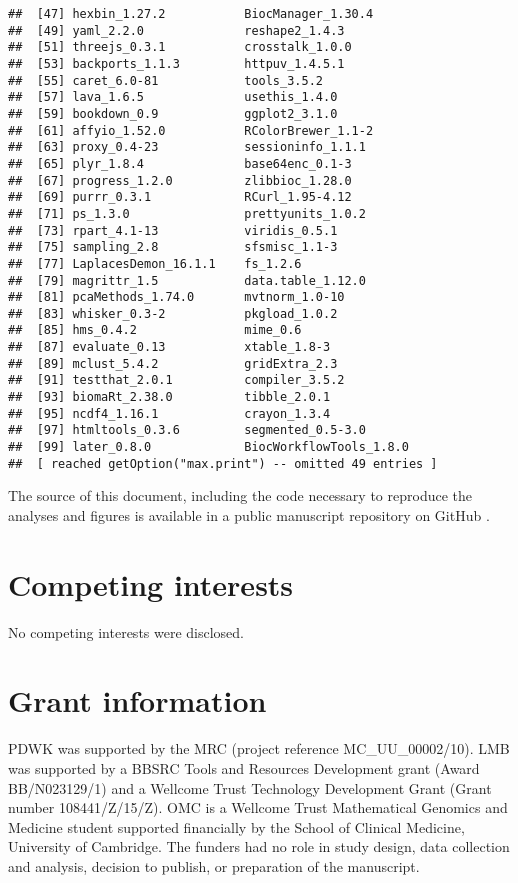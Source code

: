 \documentclass[9pt,a4paper,]{extarticle}
\begin{document}
\begin{verbatim}
##  [47] hexbin_1.27.2           BiocManager_1.30.4     
##  [49] yaml_2.2.0              reshape2_1.4.3         
##  [51] threejs_0.3.1           crosstalk_1.0.0        
##  [53] backports_1.1.3         httpuv_1.4.5.1         
##  [55] caret_6.0-81            tools_3.5.2            
##  [57] lava_1.6.5              usethis_1.4.0          
##  [59] bookdown_0.9            ggplot2_3.1.0          
##  [61] affyio_1.52.0           RColorBrewer_1.1-2     
##  [63] proxy_0.4-23            sessioninfo_1.1.1      
##  [65] plyr_1.8.4              base64enc_0.1-3        
##  [67] progress_1.2.0          zlibbioc_1.28.0        
##  [69] purrr_0.3.1             RCurl_1.95-4.12        
##  [71] ps_1.3.0                prettyunits_1.0.2      
##  [73] rpart_4.1-13            viridis_0.5.1          
##  [75] sampling_2.8            sfsmisc_1.1-3          
##  [77] LaplacesDemon_16.1.1    fs_1.2.6               
##  [79] magrittr_1.5            data.table_1.12.0      
##  [81] pcaMethods_1.74.0       mvtnorm_1.0-10         
##  [83] whisker_0.3-2           pkgload_1.0.2          
##  [85] hms_0.4.2               mime_0.6               
##  [87] evaluate_0.13           xtable_1.8-3           
##  [89] mclust_5.4.2            gridExtra_2.3          
##  [91] testthat_2.0.1          compiler_3.5.2         
##  [93] biomaRt_2.38.0          tibble_2.0.1           
##  [95] ncdf4_1.16.1            crayon_1.3.4           
##  [97] htmltools_0.3.6         segmented_0.5-3.0      
##  [99] later_0.8.0             BiocWorkflowTools_1.8.0
##  [ reached getOption("max.print") -- omitted 49 entries ]
\end{verbatim}

The source of this document, including the code necessary to reproduce
the analyses and figures is available in a public manuscript
repository on GitHub \citep{ghrepo}.

\hypertarget{competing-interests}{%
\section{Competing interests}\label{competing-interests}}

No competing interests were disclosed.

\hypertarget{grant-information}{%
\section{Grant information}\label{grant-information}}

PDWK was supported by the MRC (project reference MC\_UU\_00002/10). LMB
was supported by a BBSRC Tools and Resources Development grant (Award
BB/N023129/1) and a Wellcome Trust Technology Development Grant (Grant
number 108441/Z/15/Z). OMC is a Wellcome Trust Mathematical Genomics
and Medicine student supported financially by the School of Clinical
Medicine, University of Cambridge. The funders had no role in study
design, data collection and analysis, decision to publish, or
preparation of the manuscript.

\renewcommand\refname{References}
{\small}
\end{document}
